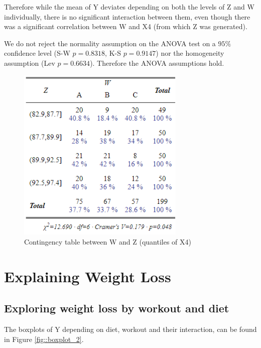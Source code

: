 \documentclass[12pt, a4paper]{article}
\begin{document}
	Therefore while the mean of Y deviates depending on both the levels of Z and W individually, there is no significant interaction between them, even though there was a significant correlation between W and X4 (from which Z was generated).
	
	We do not reject the normality assumption on the ANOVA test on a $95\%$ confidence level (S-W $p=0.8318$, K-S $p=0.9147$) nor the homogeneity assumption (Lev $p=0.6634$). Therefore the ANOVA assumptions hold.
	
	\begin{figure}
		\includegraphics[width=8cm]{contigency_1.png}
		\centering
		\caption{Contingency table between W and Z (quantiles of X4)}
		\label{fig::contigency_1}
	\end{figure}
	
	
	\section{Explaining Weight Loss}
	
	\subsection{Exploring weight loss by workout and diet}
	
	The boxplots of Y depending on diet, workout and their interaction, can be found in Figure \ref{fig::boxplot_2}.
	
\end{document}
